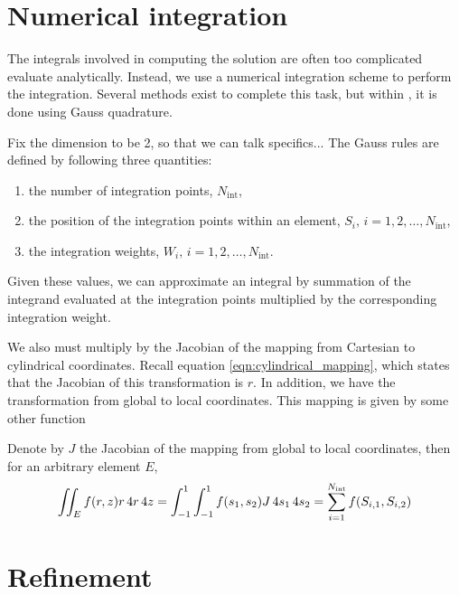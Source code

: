 
\section{Numerical integration}
\label{sec:integration}

The integrals involved in computing the solution are often too complicated evaluate analytically.
Instead, we use a numerical integration scheme to perform the integration.
Several methods exist to complete this task, but within \oomph, it is done using Gauss quadrature.

\cite{oomph}
Fix the dimension to be 2, so that we can talk specifics...
The Gauss rules are defined by following three quantities:
\begin{enumerate}
	\item the number of integration points, $N_\mathrm{int}$,
	\item the position of the integration points within an element, $S_i, \, i=1,2,\ldots,N_\mathrm{int}$,
	\item the integration weights, $W_i, \, i=1,2,\ldots,N_\mathrm{int}$.
\end{enumerate} 
Given these values, we can approximate an integral by summation of the integrand evaluated at the integration points multiplied by the corresponding integration weight.

We also must multiply by the Jacobian of the mapping from Cartesian to cylindrical coordinates.
Recall equation \eqref{eqn:cylindrical_mapping}, which states that the Jacobian of this transformation is $r$.
In addition, we have the transformation from global to local coordinates.
This mapping is given by some other function

Denote by $J$ the Jacobian of the mapping from global to local coordinates, then for an arbitrary element $E$, 
\begin{align}
	\iint_E f(r,z) r \,4 r \,4 z = \int_{-1}^1 \int_{-1}^1  f(s_1, s_2) J \, 4 s_1 \, 4 s_2 = \sum_{i=1}^{N_\mathrm{int}} f(S_{i,1},S_{i,2}) 
\end{align}







\section{Refinement}

